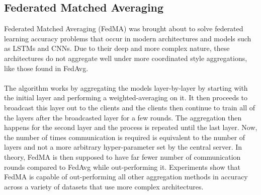 \subsection{Federated Matched Averaging}
Federated Matched Averaging (FedMA) \cite{fedma} was brought about to solve federated learning accuracy problems that occur in modern architectures and models such as LSTMs and CNNs.
Due to their deep and more complex nature, these architectures do not aggregate well under more coordinated style aggregations, like those found in FedAvg.
\\ \\
The algorithm works by aggregating the models layer-by-layer by starting with the initial layer and performing a weighted-averaging on it.
It then proceeds to broadcast this layer out to the clients and the clients then continue to train all of the layers after the broadcasted layer for a few rounds.
The aggregation then happens for the second layer and the process is repeated until the last layer.
Now, the number of times communication is required is equivalent to the number of layers and not a more arbitrary hyper-parameter set by the central server.
In theory, FedMA is then supposed to have far fewer number of communication rounds compared to FedAvg while out-performing it.
Experiments show \cite{fedma} that FedMA is capable of out-performing all other aggregation methods in accuracy across a variety of datasets that use more complex architectures.



